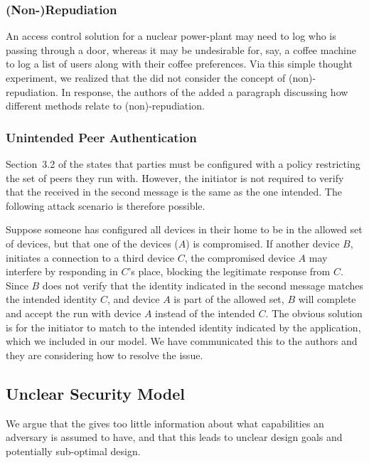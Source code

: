 \documentclass[runningheads]{llncs}
\begin{document}
\subsubsection{(Non-)Repudiation}
An access control solution for a nuclear power-plant may need to log who is
passing through a door, whereas it may be undesirable for, say, a coffee
machine to log a list of users along with their coffee preferences.
%
Via this simple thought experiment, we realized that the \mSpec{} did not
consider the concept of (non)-repudiation.
%
In response, the authors of the \mSpec{} added a paragraph discussing how
different methods relate to (non)-repudiation.

\subsubsection{Unintended Peer Authentication}
Section~3.2 of the \mSpec{} states that parties must be configured
with a policy restricting the set of peers they run \mEdhoc{} with.
%
However, the initiator is not required to verify that the \mIdcredr{} received
in the second message is the same as the one intended.
%
The following attack scenario is therefore possible.
%

Suppose someone has configured all devices in their home to be in the
allowed set of devices, but that one of the devices ($A$) is compromised.
%
If another device $B$, initiates a connection to a third device $C$, the
compromised device $A$ may interfere by responding in $C$'s place, blocking
the legitimate response from $C$.
%
Since $B$ does not verify that the identity indicated in the second message
matches the intended identity $C$, and device $A$ is part of the allowed set,
$B$ will complete and accept the \mEdhoc{} run with device $A$ instead of the
intended $C$.
%
The obvious solution is for the initiator to match \mIdcredr{} to the intended
identity indicated by the application, which we included in our model.
%
We have communicated this to the \mEdhoc{} authors and they are considering
how to resolve the issue.
%

\subsection{Unclear Security Model}
We argue that the \mSpec{} gives too little information about what capabilities
an adversary is assumed to have, and that this leads to unclear design goals and
potentially sub-optimal design.
%
\end{document}
